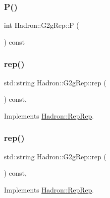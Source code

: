 \subsubsection{\texorpdfstring{P()}{P()}}
{\footnotesize\ttfamily int Hadron\+::\+G2g\+Rep\+::P (\begin{DoxyParamCaption}{ }\end{DoxyParamCaption}) const\hspace{0.3cm}{\ttfamily [inline]}}

\mbox{\label{structHadron_1_1G2gRep_a18380ef621e1c6761e5a8b3ff7170f87}} 
\subsubsection{\texorpdfstring{rep()}{rep()}\hspace{0.1cm}{\footnotesize\ttfamily [1/3]}}
{\footnotesize\ttfamily std\+::string Hadron\+::\+G2g\+Rep\+::rep (\begin{DoxyParamCaption}{ }\end{DoxyParamCaption}) const\hspace{0.3cm}{\ttfamily [inline]}, {\ttfamily [virtual]}}



Implements \mbox{\hyperlink{structHadron_1_1RepRep_ab3213025f6de249f7095892109575fde}{Hadron\+::\+Rep\+Rep}}.

\mbox{\label{structHadron_1_1G2gRep_a18380ef621e1c6761e5a8b3ff7170f87}} 
\subsubsection{\texorpdfstring{rep()}{rep()}\hspace{0.1cm}{\footnotesize\ttfamily [2/3]}}
{\footnotesize\ttfamily std\+::string Hadron\+::\+G2g\+Rep\+::rep (\begin{DoxyParamCaption}{ }\end{DoxyParamCaption}) const\hspace{0.3cm}{\ttfamily [inline]}, {\ttfamily [virtual]}}



Implements \mbox{\hyperlink{structHadron_1_1RepRep_ab3213025f6de249f7095892109575fde}{Hadron\+::\+Rep\+Rep}}.

